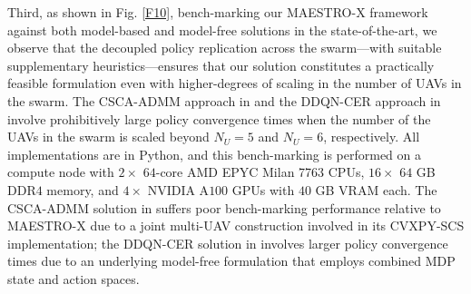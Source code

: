 \documentclass[12pt, draftcls, onecolumn]{IEEEtran}
\theoremstyle{plain}
\theoremstyle{definition}
\theoremstyle{remark}
\begin{document}
Third, as shown in Fig. \ref{F10}, bench-marking our MAESTRO-X framework against both model-based \cite{CSCA-ADMM} and model-free \cite{DDQN} solutions in the state-of-the-art, we observe that the decoupled policy replication across the swarm---with suitable supplementary heuristics---ensures that our solution constitutes a practically feasible formulation even with higher-degrees of scaling in the number of UAVs in the swarm. The CSCA-ADMM approach in \cite{CSCA-ADMM} and the DDQN-CER approach in \cite{DDQN} involve prohibitively large policy convergence times when the number of the UAVs in the swarm is scaled beyond $N_{U}{=}5$ and $N_{U}{=}6$, respectively. All implementations are in Python, and this bench-marking is performed on a compute node with $2{\times}$ $64$-core AMD EPYC Milan 7763 CPUs, $16{\times}$ $64$ GB DDR$4$ memory, and $4{\times}$ NVIDIA A$100$ GPUs with $40$ GB VRAM each. The CSCA-ADMM solution in \cite{CSCA-ADMM} suffers poor bench-marking performance relative to MAESTRO-X due to a joint multi-UAV construction involved in its CVXPY-SCS implementation; the DDQN-CER solution in \cite{DDQN} involves larger policy convergence times due to an underlying model-free formulation that employs combined MDP state and action spaces.
\end{document}
